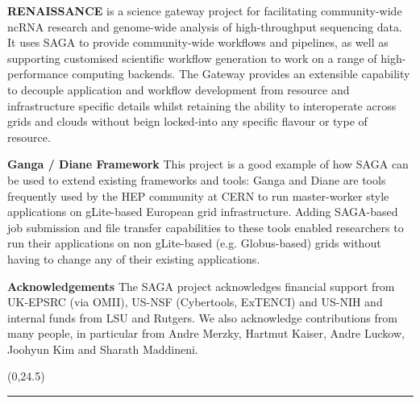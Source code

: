 \documentclass[a0b,portrait]{a0poster}
\def\LHead#1{\bigskip\bigskip\noindent{\huge\color{HeadColor} #1}\smallskip}
\begin{document}
\begin{textblock}{7}
\textbf{\color{DarkBlue} RENAISSANCE} is a science gateway project for
facilitating community-wide ncRNA research and genome-wide analysis of
high-throughput sequencing data. It uses SAGA to provide
community-wide workflows and pipelines, as well as supporting
customised scientific workflow generation to work on a range of
high-performance computing backends. The Gateway provides an
extensible capability to decouple application and workflow development
from resource and infrastructure specific details whilst retaining the
ability to interoperate across grids and clouds without beign
locked-into any specific flavour or type of resource.



\textbf{\color{DarkBlue} Ganga / Diane Framework } This project is a good
example of how SAGA can be used to extend existing frameworks and tools: Ganga
and Diane are tools frequently used by the HEP community at CERN to run
master-worker style applications on  gLite-based European grid infrastructure.
Adding SAGA-based job submission and file transfer capabilities to these tools
enabled researchers to run their applications on non gLite-based (e.g.
Globus-based) grids without having to change any of their existing
applications.


\vspace{-0.1in}
\textbf{\color{Red} Acknowledgements} The SAGA project acknowledges
financial support from UK-EPSRC (via OMII), US-NSF (Cybertools,
ExTENCI) and US-NIH and internal funds from LSU and Rutgers.  We also
acknowledge contributions from many people, in particular from Andre
Merzky, Hartmut Kaiser, Andre Luckow, Joohyun Kim and Sharath
Maddineni.
\end{textblock}

\begin{textblock}{15}(0,24.5)
\color{LightGray}
\rule{\linewidth}{2pt}
\end{textblock}
\end{document}
